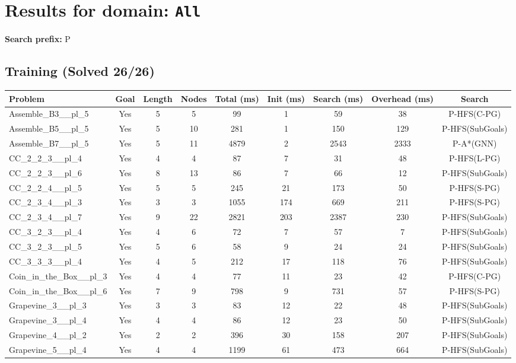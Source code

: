\documentclass{article}
\begin{document}
\section*{Results for domain: \texttt{All}}
\textbf{Search prefix:} P
\\[0.5cm]
\subsection*{Training (Solved 26/26)}
\begin{tabular}{lcccccccc}
\toprule
Problem & Goal & Length & Nodes & Total (ms) & Init (ms) & Search (ms) & Overhead (ms) & Search \\
\midrule
Assemble\_B3\_\_pl\_5 & Yes & 5 & 5 & 99 & 1 & 59 & 38 & P-HFS(C-PG) \\
Assemble\_B5\_\_pl\_5 & Yes & 5 & 10 & 281 & 1 & 150 & 129 & P-HFS(SubGoals) \\
Assemble\_B7\_\_pl\_5 & Yes & 5 & 11 & 4879 & 2 & 2543 & 2333 & P-A*(GNN) \\
CC\_2\_2\_3\_\_pl\_4 & Yes & 4 & 4 & 87 & 7 & 31 & 48 & P-HFS(L-PG) \\
CC\_2\_2\_3\_\_pl\_6 & Yes & 8 & 13 & 86 & 7 & 66 & 12 & P-HFS(SubGoals) \\
CC\_2\_2\_4\_\_pl\_5 & Yes & 5 & 5 & 245 & 21 & 173 & 50 & P-HFS(S-PG) \\
CC\_2\_3\_4\_\_pl\_3 & Yes & 3 & 3 & 1055 & 174 & 669 & 211 & P-HFS(S-PG) \\
CC\_2\_3\_4\_\_pl\_7 & Yes & 9 & 22 & 2821 & 203 & 2387 & 230 & P-HFS(SubGoals) \\
CC\_3\_2\_3\_\_pl\_4 & Yes & 4 & 6 & 72 & 7 & 57 & 7 & P-HFS(SubGoals) \\
CC\_3\_2\_3\_\_pl\_5 & Yes & 5 & 6 & 58 & 9 & 24 & 24 & P-HFS(SubGoals) \\
CC\_3\_3\_3\_\_pl\_4 & Yes & 4 & 5 & 212 & 17 & 118 & 76 & P-HFS(SubGoals) \\
Coin\_in\_the\_Box\_\_pl\_3 & Yes & 4 & 4 & 77 & 11 & 23 & 42 & P-HFS(C-PG) \\
Coin\_in\_the\_Box\_\_pl\_6 & Yes & 7 & 9 & 798 & 9 & 731 & 57 & P-HFS(S-PG) \\
Grapevine\_3\_\_pl\_3 & Yes & 3 & 3 & 83 & 12 & 22 & 48 & P-HFS(SubGoals) \\
Grapevine\_3\_\_pl\_4 & Yes & 4 & 4 & 86 & 12 & 23 & 50 & P-HFS(SubGoals) \\
Grapevine\_4\_\_pl\_2 & Yes & 2 & 2 & 396 & 30 & 158 & 207 & P-HFS(SubGoals) \\
Grapevine\_5\_\_pl\_4 & Yes & 4 & 4 & 1199 & 61 & 473 & 664 & P-HFS(SubGoals) \\

\end{tabular}
\end{document}
